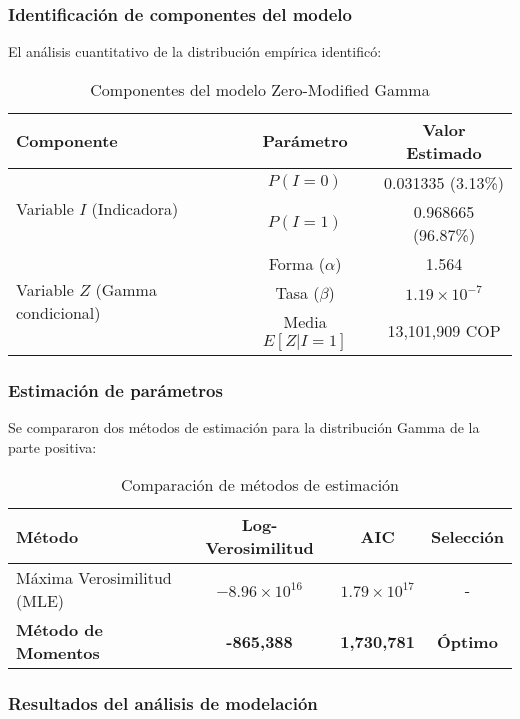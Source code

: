 \subsubsection{Identificación de componentes del modelo}

El análisis cuantitativo de la distribución empírica identificó:

\begin{table}[H]
\centering
\caption{Componentes del modelo Zero-Modified Gamma}
\begin{tabular}{lcc}
\hline
\textbf{Componente} & \textbf{Parámetro} & \textbf{Valor Estimado} \\
\hline
\multirow{2}{*}{Variable $I$ (Indicadora)} & $P(I = 0)$ & 0.031335 (3.13\%) \\
& $P(I = 1)$ & 0.968665 (96.87\%) \\
\hline
\multirow{3}{*}{Variable $Z$ (Gamma condicional)} & Forma ($\alpha$) & 1.564 \\
& Tasa ($\beta$) & $1.19 \times 10^{-7}$ \\
& Media $E[Z|I=1]$ & 13,101,909 COP \\
\hline
\end{tabular}
\end{table}

\subsubsection{Estimación de parámetros}

Se compararon dos métodos de estimación para la distribución Gamma de la parte positiva:

\begin{table}[H]
\centering
\caption{Comparación de métodos de estimación}
\begin{tabular}{lccc}
\hline
\textbf{Método} & \textbf{Log-Verosimilitud} & \textbf{AIC} & \textbf{Selección} \\
\hline
Máxima Verosimilitud (MLE) & $-8.96 \times 10^{16}$ & $1.79 \times 10^{17}$ & - \\
\textbf{Método de Momentos} & \textbf{-865,388} & \textbf{1,730,781} & \textbf{Óptimo} \\
\hline
\end{tabular}
\end{table}

\subsubsection{Resultados del análisis de modelación}

